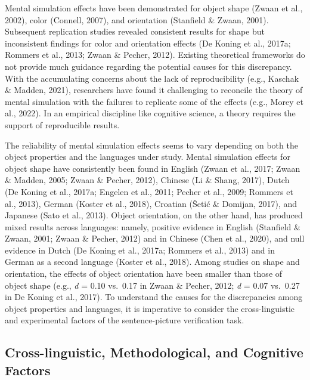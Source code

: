 \documentclass[
  man,floatsintext]{apa7}
\begin{document}
Mental simulation effects have been demonstrated for object shape
(Zwaan et al., 2002), color
(Connell, 2007), and orientation
(Stanfield \& Zwaan, 2001). Subsequent replication studies revealed
consistent results for shape but inconsistent findings for color and
orientation effects (De Koning et al., 2017a; Rommers et al., 2013; Zwaan \& Pecher, 2012). Existing theoretical frameworks
do not provide much guidance regarding the potential causes for this
discrepancy. With the accumulating concerns about the lack of
reproducibility (e.g., Kaschak \& Madden, 2021), researchers
have found it challenging to reconcile the theory of mental simulation
with the failures to replicate some of the effects (e.g., Morey et al., 2022).
In an empirical discipline like cognitive science, a theory requires the
support of reproducible results.

The reliability of mental simulation effects seems to vary depending on
both the object properties and the languages under study. Mental
simulation effects for object shape have consistently been found in
English (Zwaan et al., 2017; Zwaan \& Madden, 2005; Zwaan \& Pecher, 2012), Chinese (Li \& Shang, 2017),
Dutch (De Koning et al., 2017a; Engelen et al., 2011; Pecher et al., 2009; Rommers et al., 2013), German
(Koster et al., 2018), Croatian
(Šetić \& Domijan, 2017), and Japanese
(Sato et al., 2013). Object orientation, on the other hand, has
produced mixed results across languages: namely, positive evidence in
English (Stanfield \& Zwaan, 2001; Zwaan \& Pecher, 2012)
and in Chinese (Chen et al., 2020), and null evidence in Dutch
(De Koning et al., 2017a; Rommers et al., 2013) and in German
as a second language (Koster et al., 2018). Among studies
on shape and orientation, the effects of object orientation have been
smaller than those of object shape (e.g., \emph{d} = 0.10 vs.~0.17 in Zwaan \&
Pecher, 2012; \emph{d} = 0.07 vs.~0.27 in De Koning et al., 2017). To
understand the causes for the discrepancies among object properties and
languages, it is imperative to consider the cross-linguistic and
experimental factors of the sentence-picture verification task.

\hypertarget{cross-linguistic-methodological-and-cognitive-factors}{%
\subsection{Cross-linguistic, Methodological, and Cognitive Factors}\label{cross-linguistic-methodological-and-cognitive-factors}}
\end{document}
